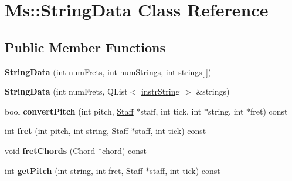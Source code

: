 \hypertarget{class_ms_1_1_string_data}{}\section{Ms\+:\+:String\+Data Class Reference}
\label{class_ms_1_1_string_data}
\subsection*{Public Member Functions}
\begin{DoxyCompactItemize}
\item 
\mbox{\label{class_ms_1_1_string_data_acfd3ef522bdbf4634988217c542b2b77}} 
{\bfseries String\+Data} (int num\+Frets, int num\+Strings, int strings\mbox{[}$\,$\mbox{]})
\item 
\mbox{\label{class_ms_1_1_string_data_abc011c67a9491957bd9395214e42e79e}} 
{\bfseries String\+Data} (int num\+Frets, Q\+List$<$ \hyperlink{struct_ms_1_1instr_string}{instr\+String} $>$ \&strings)
\item 
\mbox{\label{class_ms_1_1_string_data_a24e27da5e3b986f6b08010f3ddd5ff59}} 
bool {\bfseries convert\+Pitch} (int pitch, \hyperlink{class_ms_1_1_staff}{Staff} $\ast$staff, int tick, int $\ast$string, int $\ast$fret) const
\item 
\mbox{\label{class_ms_1_1_string_data_a9f3ccaab30ddc398f28772ef06451a89}} 
int {\bfseries fret} (int pitch, int string, \hyperlink{class_ms_1_1_staff}{Staff} $\ast$staff, int tick) const
\item 
\mbox{\label{class_ms_1_1_string_data_aae089ceff91360aa295a4378bd288383}} 
void {\bfseries fret\+Chords} (\hyperlink{class_ms_1_1_chord}{Chord} $\ast$chord) const
\item 
\mbox{\label{class_ms_1_1_string_data_a4c6686330462bf909da0cea3b4757627}} 
int {\bfseries get\+Pitch} (int string, int fret, \hyperlink{class_ms_1_1_staff}{Staff} $\ast$staff, int tick) const
\item 
\mbox{\label{class_ms_1_1_string_data_a59a2c70ea01631416d53d3db184a45ab}} 

\end{DoxyCompactItemize}
